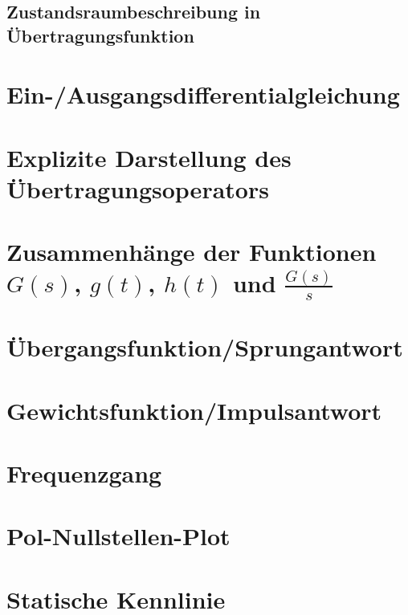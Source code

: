 \documentclass[
  ngerman
  ,12pt
  ,pdftex
]{article}
\begin{document}
\subsection{Zustandsraumbeschreibung in Übertragungsfunktion}  %

\vspace*{1cm}


\section{Ein-/Ausgangsdifferentialgleichung}    %

\vspace*{1cm}


\section{Explizite Darstellung des Übertragungsoperators}

\vspace*{1cm}


\section{Zusammenhänge der Funktionen $G(s)$, $g(t)$, $h(t)$ und $\frac{G(s)}{s}$}

\vspace*{1cm}


\section{Übergangsfunktion/Sprungantwort}

\vspace*{1cm}


\section{Gewichtsfunktion/Impulsantwort}

\vspace*{1cm}


\section{Frequenzgang}

\vspace*{1cm}


\section{Pol-Nullstellen-Plot}



\section{Statische Kennlinie}

\end{document}
